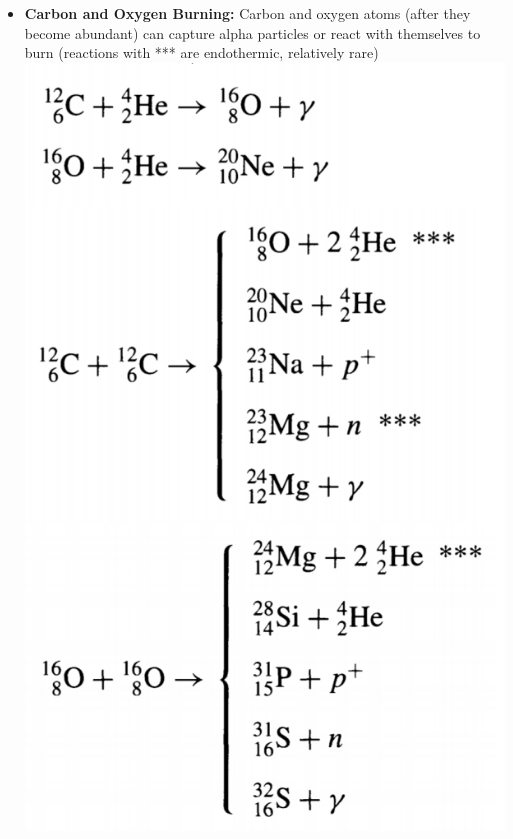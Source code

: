 \documentclass[12pt]{article}
\begin{document}
\begin{itemize}
    \item \textbf{Carbon and Oxygen Burning:} Carbon and oxygen atoms (after they become abundant) can capture alpha particles or react with themselves to burn (reactions with *** are endothermic, relatively rare)\newline\includegraphics[scale=0.7]{Figures/COBurning.png}
\end{itemize}
\end{document}
